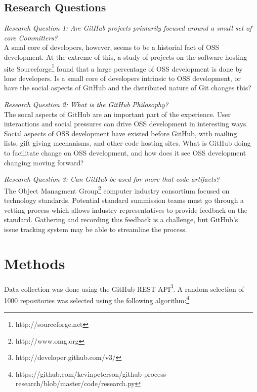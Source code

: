 \documentclass{proc}
\begin{document}
\subsection{Research Questions}

\emph{Research Question 1: Are GitHub projects primarily focused around a small set of core Committers?}\\
A smal core of developers, however, seems to be a historial fact of OSS development\cite{mockus2000case,mockus2000two,krishnamurthy2002cave}. At the extreme of this, a study of projects on the software hosting site Sourceforge\footnote{http://sourceforge.net} found that a large percentage of OSS development is done by lone developers. Is a small core of developers intrinsic to OSS development, or have the social aspects of GitHub and the distributed nature of Git changes this?

\emph{Research Question 2: What is the GitHub Philosophy?}\\
The socal aspects of GitHub are an important part of the experience\cite{dabbish2012social}. User interactions and social pressures can drive OSS development in interesting ways. Social aspects of OSS development have existed before GitHub, with mailing lists\cite{mockus2000case}, gift giving mechanisms\cite{bergquist2008power}, and other code hosting sites. What is GitHub doing to facilitate change on OSS development, and how does it see OSS development changing moving forward?

\emph{Research Question 3: Can GitHub be used for more that code artifacts?}\\
The Object Managment Group\textregistered\footnote{http://www.omg.org} computer industry consortium focused on technology standards. Potential standard summission teams must go through a vetting process\cite{kobryn1999uml} which allows industry representatives to provide feedback on the standard. Gathering and recording this feedback is a challenge, but GitHub's issue tracking system may be able to streamline the process.

\section{Methods}
Data collection was done using the GitHub REST API\footnote{http://developer.github.com/v3/}. A random selection of 1000 repositories was selected using the following algorithm:\footnote{https://github.com/kevinpeterson/github-process-research/blob/master/code/research.py}
\end{document}
